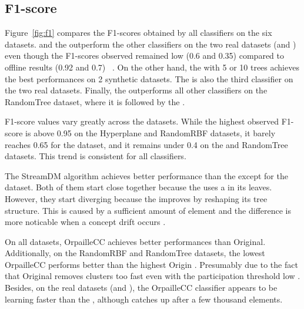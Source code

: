 \subsection{F1-score}
Figure~\ref{fig:f1} compares the F1-scores obtained by all classifiers on the
six datasets.
\naivebayes and the \hoeffdingtree outperform the other classifiers on the two
real datasets (\banosdataset and \recofitdataset) even though the F1-scores
observed remained low (0.6 and 0.35) compared to offline results (0.92 and
0.7)~\cite{behzad2019} .  On the other hand, the \mondrianforest with 5 or 10
trees achieves the best performances on 2 synthetic datasets.  The
\mondrianforest {} is also the third classifier on the two real datasets.  Finally, the
\hoeffdingtree outperforms all other classifiers on the RandomTree dataset,
where it is followed by the \mondrianforest.

F1-score values vary greatly across the datasets.  While the highest
observed F1-score is above 0.95 on the Hyperplane and RandomRBF datasets,
it barely reaches 0.65 for the \banosdataset dataset, and it remains under
0.4 on the \recofitdataset and RandomTree datasets. This trend is
consistent for all classifiers.

The StreamDM \hoeffdingtree algorithm achieves better performance than the
\naivebayes except for the \banosdataset dataset.  Both of them start close
together because the \hoeffdingtree uses a \naivebayes in its leaves.  However,
they start diverging because the \hoeffdingtree improves by reshaping its tree
structure.  This is caused by a sufficient amount of element and the difference
is more noticable when a concept drift occurs .

On all datasets, \mcnn OrpailleCC achieves better performances than \mcnn
Original. Additionally, on the RandomRBF and RandomTree datasets, the lowest
\mcnn OrpailleCC performs better than the highest \mcnn Origin . Presumably due
to the fact that \mcnn Original removes clusters too fast even with the
participation threshold low .
Besides, on the real datasets (\banosdataset and \recofitdataset), the \mcnn OrpailleCC
classifier appears to be learning faster than the \mondrianforest, although
\mondrianforest catches up after a few thousand elements. 

